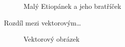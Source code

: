 \documentclass[11pt,a4paper]{article}
\begin{document}
\begin{figure}[ht]
\begin{center}
{  }
  \caption{Malý Etiopánek a jeho bratříček}
  \label{etiopiaboys}
  \end{center}
\end{figure}
Rozdíl mezi vektorovým\dots
\begin{figure}[ht]
  \begin{center}
  \caption{Vektorový obrázek}
  \label{oniisanvector}
  \end{center}
\end{figure}
\end{document}
